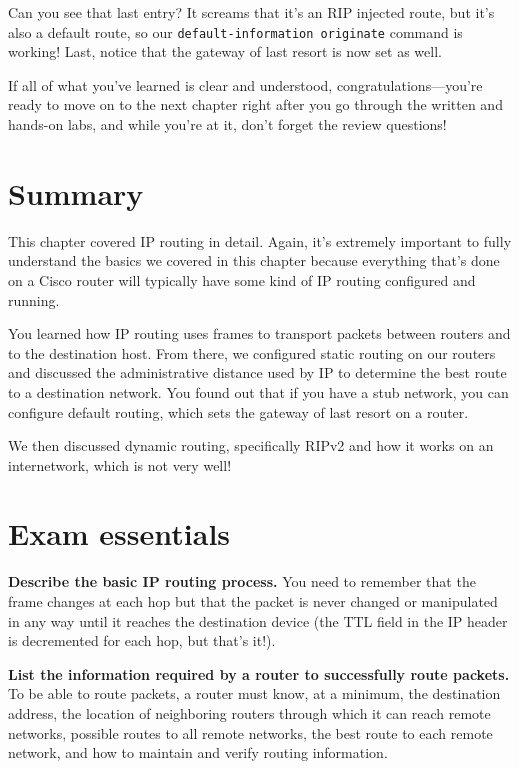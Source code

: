 Can you see that last entry? It screams that it's an RIP injected route,
but it's also a default route, so our
\texttt{default-information\ originate} command is working! Last, notice
that the gateway of last resort is now set as well.

If all of what you've learned is clear and understood,
congratulations---you're ready to move on to the next chapter right
after you go through the written and hands-on labs, and while you're at
it, don't forget the review questions!



\section{Summary}

This chapter covered IP routing in detail. Again, it's extremely
important to fully understand the basics we covered in this chapter
because everything that's done on a Cisco router will typically have
some kind of IP routing configured and running.

You learned how IP routing uses frames to transport packets between
routers and to the destination host. From there, we configured static
routing on our routers and discussed the administrative distance used by
IP to determine the best route to a destination network. You found out
that if you have a stub network, you can configure default routing,
which sets the gateway of last resort on a router.

We then discussed dynamic routing, specifically RIPv2 and how it works
on an internetwork, which is not very well!



\section{Exam essentials}

\textbf{Describe the basic IP routing process.} You need to remember
that the frame changes at each hop but that the packet is never changed
or manipulated in any way until it reaches the destination device (the
TTL field in the IP header is decremented for each hop, but that's it!).

\textbf{List the information required by a router to successfully route
packets.} To be able to route packets, a router must know, at a minimum,
the destination address, the location of neighboring routers through
which it can reach remote networks, possible routes to all remote
networks, the best route to each remote network, and how to maintain and
verify routing information.

